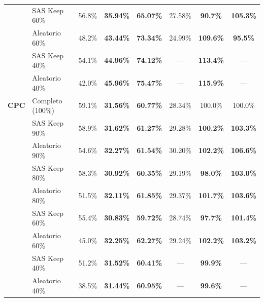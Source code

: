 \begin{table}[t]
\begin{tabular}{llcccccc}
                       & SAS Keep 60\%     & 56.8\% \cite{joshi2023sas}                & \textbf{35.94\%} & \textbf{65.07\%} & 27.58\% & \textbf{90.7\%} & \textbf{105.3\%} \\
                       & Aleatorio 60\%    & 48.2\% \cite{joshi2023sas}                & \textbf{43.44\%} & \textbf{73.34\%} & 24.99\% & \textbf{109.6\%} & \textbf{95.5\%} \\
                       & SAS Keep 40\%     & 54.1\% \cite{joshi2023sas}                & \textbf{44.96\%} & \textbf{74.12\%} & ---     & \textbf{113.4\%} & --- \\
                       & Aleatorio 40\%    & 42.0\% \cite{joshi2023sas}                & \textbf{45.96\%} & \textbf{75.47\%} & ---     & \textbf{115.9\%} & --- \\
\midrule
\textbf{CPC}           & Completo (100\%)  & 59.1\% \cite{joshi2023sas}                & \textbf{31.56\%} & \textbf{60.77\%} & 28.34\% & 100.0\% & 100.0\% \\
                       & SAS Keep 90\%     & 58.9\% \cite{joshi2023sas}                & \textbf{31.62\%} & \textbf{61.27\%} & 29.28\% & \textbf{100.2\%} & \textbf{103.3\%} \\
                       & Aleatorio 90\%    & 54.6\% \cite{joshi2023sas}                & \textbf{32.27\%} & \textbf{61.54\%} & 30.20\% & \textbf{102.2\%} & \textbf{106.6\%} \\
                       & SAS Keep 80\%     & 58.3\% \cite{joshi2023sas}                & \textbf{30.92\%} & \textbf{60.35\%} & 29.19\% & \textbf{98.0\%} & \textbf{103.0\%} \\
                       & Aleatorio 80\%    & 51.5\% \cite{joshi2023sas}                & \textbf{32.11\%} & \textbf{61.85\%} & 29.37\% & \textbf{101.7\%} & \textbf{103.6\%} \\
                       & SAS Keep 60\%     & 55.4\% \cite{joshi2023sas}                & \textbf{30.83\%} & \textbf{59.72\%} & 28.74\% & \textbf{97.7\%} & \textbf{101.4\%} \\
                       & Aleatorio 60\%    & 45.0\% \cite{joshi2023sas}                & \textbf{32.25\%} & \textbf{62.27\%} & 29.24\% & \textbf{102.2\%} & \textbf{103.2\%} \\
                       & SAS Keep 40\%     & 51.2\% \cite{joshi2023sas}                & \textbf{31.52\%} & \textbf{60.41\%} & ---     & \textbf{99.9\%} & --- \\
                       & Aleatorio 40\%    & 38.5\% \cite{joshi2023sas}                & \textbf{31.44\%} & \textbf{60.95\%} & ---     & \textbf{99.6\%} & --- \\
\bottomrule
\end{tabular}
\end{table}

